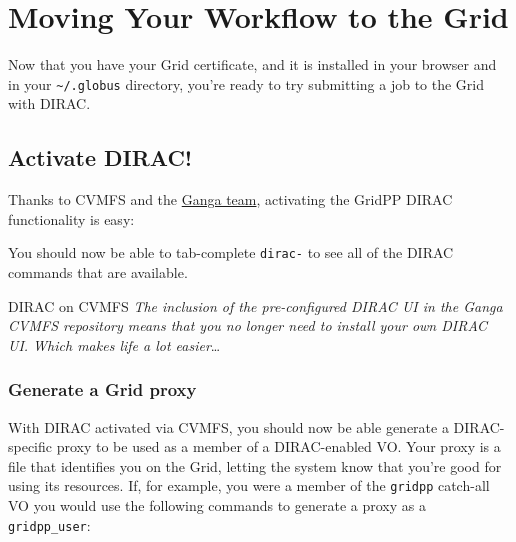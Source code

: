 \section{Moving Your Workflow to the Grid}
\label{sec:gridrunning}
Now that you have your Grid certificate, and it is installed in your
browser and in your \texttt{\textasciitilde{}/.globus} directory, you're
ready to try submitting a job to the Grid with DIRAC.

\subsection{Activate DIRAC!}
\label{activate-dirac}
Thanks to CVMFS and the \href{https://github.com/ganga-devs/}{Ganga
team}, activating the GridPP DIRAC functionality is easy:

\begin{Shaded}
\begin{Highlighting}[]
\NormalTok{$ } 
\end{Highlighting}
\end{Shaded}

You should now be able to tab-complete \texttt{dirac-} to see all of the
DIRAC commands that are available.

\begin{infobox}{DIRAC on CVMFS}
\emph{The inclusion of the pre-configured DIRAC UI in the Ganga CVMFS
repository means that you no longer need to install your own DIRAC UI.
Which makes life a lot easier}\ldots{}
\end{infobox}

\subsubsection{Generate a Grid proxy}
\label{generate-a-grid-proxy}
With DIRAC activated via CVMFS, you should now be able generate a
DIRAC-specific proxy to be used as a member of a DIRAC-enabled VO. Your
proxy is a file that identifies you on the Grid, letting the system know
that you're good for using its resources. If, for example, you were a
member of the \texttt{gridpp} catch-all VO you would use the following
commands to generate a proxy as a \texttt{gridpp\_user}:


